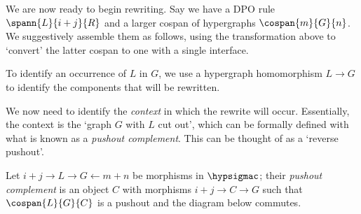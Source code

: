 We are now ready to begin rewriting.
Say we have a DPO rule \(\spann{L}{i + j}{R}\) and a larger cospan of
hypergraphs \(\cospan{m}{G}{n}\).
We suggestively assemble them as follows, using the transformation above to
`convert' the latter cospan to one with a single interface.

\begin{center}
\end{center}

To identify an occurrence of \(L\) in \(G\), we use a
hypergraph homomorphism \(L \to G\) to identify the components that will be
rewritten.

\begin{center}
\end{center}

We now need to identify the \emph{context} in which the rewrite will occur.
Essentially, the context is the `graph \(G\) with \(L\) cut out', which can be
formally defined with what is known as a \emph{pushout complement}.
This can be thought of as a `reverse pushout'.

\begin{definition}\label{def:pushout-complement}
    Let \(i+j \to L \to G \leftarrow m+n\) be morphisms in
    \(\hypsigmac\); their \emph{pushout complement} is an object \(C\)
    with morphisms \(i+j \to C \to G\) such that \(\cospan{L}{G}{C}\) is a
    pushout and the diagram below commutes.
    \begin{center}
    \end{center}
\end{definition}


